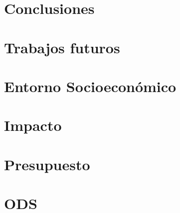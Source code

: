 \documentclass[12pt]{report} %
\begin{document}
\section{Conclusiones}
\section{Trabajos futuros}

\section{Entorno Socioeconómico}
\section{Impacto}
\section{Presupuesto}
\section{ODS}


	

    
    
\end{document}
